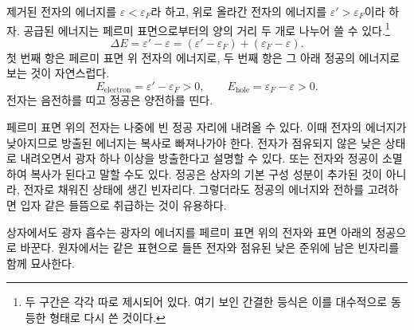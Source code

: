 제거된 전자의 에너지를 \(\varepsilon<\varepsilon_F\)라 하고, 위로 올라간 전자의 에너지를 \(\varepsilon'>\varepsilon_F\)이라 하자. 공급된 에너지는 페르미 표면으로부터의 양의 거리 두 개로 나누어 쓸 수 있다.\footnote{두 구간은 각각 따로 제시되어 있다. 여기 보인 간결한 등식은 이를 대수적으로 동등한 형태로 다시 쓴 것이다.}
\begin{equation}
\Delta E
=\varepsilon'-\varepsilon
=(\varepsilon'-\varepsilon_F)+(\varepsilon_F-\varepsilon).
\end{equation}
첫 번째 항은 페르미 표면 위 전자의 에너지로, 두 번째 항은 그 아래 정공의 에너지로 보는 것이 자연스럽다.
\begin{equation}
E_{\mathrm{electron}}=\varepsilon'-\varepsilon_F>0,
\qquad
E_{\mathrm{hole}}=\varepsilon_F-\varepsilon>0.
\end{equation}
전자는 음전하를 띠고 정공은 양전하를 띤다.

페르미 표면 위의 전자는 나중에 빈 정공 자리에 내려올 수 있다. 이때 전자의 에너지가 낮아지므로 방출된 에너지는 복사로 빠져나가야 한다. 전자가 점유되지 않은 낮은 상태로 내려오면서 광자 하나 이상을 방출한다고 설명할 수 있다. 또는 전자와 정공이 소멸하여 복사가 된다고 말할 수도 있다. 정공은 상자의 기본 구성 성분이 추가된 것이 아니라, 전자로 채워진 상태에 생긴 빈자리다. 그렇더라도 정공의 에너지와 전하를 고려하면 입자 같은 들뜸으로 취급하는 것이 유용하다.

\begin{classroomqa}
\end{classroomqa}

상자에서도 광자 흡수는 광자의 에너지를 페르미 표면 위의 전자와 표면 아래의 정공으로 바꾼다. 원자에서는 같은 표현으로 들뜬 전자와 점유된 낮은 준위에 남은 빈자리를 함께 묘사한다.

\begin{classroomqa}
\end{classroomqa}


